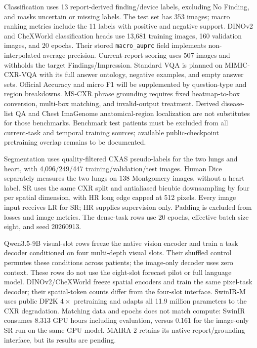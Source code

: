 Classification uses 13 report-derived finding/device labels, excluding No Finding,
and masks uncertain or missing labels. The test set has 353 images; macro ranking
metrics include the 11 labels with positive and negative support. DINOv2 and
CheXWorld classification heads use 13,681 training images, 160 validation images,
and 20 epochs. Their stored \texttt{macro\_auprc} field implements
non-interpolated average precision. Current-report scoring uses 507 images and
withholds the target Findings/Impression. Standard VQA is planned on
MIMIC-CXR-VQA with its full answer ontology, negative examples, and empty answer
sets. Official Accuracy and micro F1 will be supplemented by question-type and
region breakdowns. MS-CXR phrase grounding requires fixed heatmap-to-box
conversion, multi-box matching, and invalid-output treatment. Derived
disease-list QA and Chest ImaGenome anatomical-region localization are not
substitutes for those benchmarks. Benchmark test patients must be excluded from
all current-task and temporal training sources; available public-checkpoint pretraining
overlap remains to be documented.

Segmentation uses quality-filtered CXAS pseudo-labels for the two lungs and heart,
with 4,096/249/447 training/validation/test images. Human Dice separately measures
the two lungs on 138 Montgomery images, without a heart label. SR uses the same
CXR split and antialiased bicubic downsampling by four per spatial dimension,
with HR long edge capped at 512 pixels. Every image input receives LR for SR;
HR supplies supervision only. Padding is excluded from losses and image metrics.
The dense-task rows use 20 epochs, effective batch size eight, and seed 20260913.

Qwen3.5-9B visual-slot rows freeze the native vision encoder and train a task
decoder conditioned on four multi-depth visual slots. Their shuffled control
permutes these conditions across patients; the image-only decoder uses zero
context. These rows do not use the eight-slot forecast pilot or full language
model. DINOv2/CheXWorld freeze spatial encoders and train the same pixel-task
decoder; their spatial-token counts differ from the four-slot interface.
SwinIR-M uses public DF2K $4\times$ pretraining and adapts all 11.9 million
parameters to the CXR degradation. Matching data and epochs does not match
compute: SwinIR consumes 8.313 GPU hours including evaluation, versus 0.161 for
the image-only SR run on the same GPU model. MAIRA-2 retains its native
report/grounding interface, but its results are pending.

